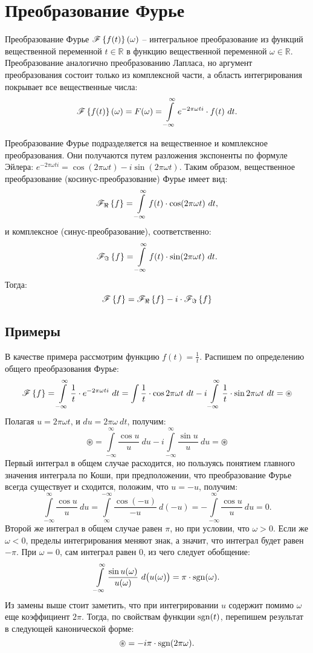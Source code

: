 \section{Преобразование Фурье}

	Преобразование Фурье $\mathscr{F} \left\lbrace {f(t)} \right\rbrace \left( \omega \right)$ -- интегральное преобразование из функций вещественной переменной $t \in \mathbb{R}$ в функцию вещественной переменной $\omega \in \mathbb{R}$. Преобразование аналогично преобразованию Лапласа, но аргумент преобразования состоит только из комплексной части, а область интегрирования покрывает все вещественные числа:
	\[ \mathscr{F} \left\lbrace {f(t)} \right\rbrace \left( \omega \right) = F(\omega) = \int\limits_{-\infty}^{\infty} e^{-2 \pi \omega t i} \cdot f(t) ~ dt. \]

	Преобразование Фурье подразделяется на вещественное и комплексное преобразования. Они получаются путем разложения экспоненты по формуле Эйлера: $e^{- 2 \pi \omega t i} = \cos(2 \pi \omega t) - i \sin(2 \pi \omega t)$. Таким образом, вещественное преобразование (косинус-преобразование) Фурье имеет вид:
	\[ \mathscr{F}_{\Re} \left\lbrace {f} \right\rbrace = \int\limits_{-\infty}^{\infty} f(t) \cdot \cos(2 \pi \omega t) ~ dt, \]
	и комплексное (синус-преобразование), соответственно:
	\[ \mathscr{F}_{\Im} \left\lbrace {f} \right\rbrace = \int\limits_{-\infty}^{\infty} f(t) \cdot \sin(2 \pi \omega t) ~ dt. \]
	Тогда:
	\[ \mathscr{F} \left\lbrace {f} \right\rbrace = \mathscr{F}_{\Re} \left\lbrace {f} \right\rbrace - i \cdot \mathscr{F}_{\Im} \left\lbrace {f} \right\rbrace \]

	\subsection{Примеры}

		В качестве примера рассмотрим функцию $f(t) = \frac{1}{t}$. Распишем по определению общего преобразования Фурье:
		\[ 
			\mathscr{F} \left\lbrace {f} \right\rbrace 
				= \int\limits_{-\infty}^{\infty} \frac{1}{t} \cdot e^{-2 \pi \omega t i} ~ dt 
				= \int \frac{1}{t} \cdot \cos{2 \pi \omega t} ~ dt 
				- i \int\limits_{-\infty}^{\infty} \frac{1}{t} \cdot \sin{2 \pi \omega t} ~ dt 
				= \circledast 
		\]
		Полагая $u = 2 \pi \omega t$, и $du = 2 \pi \omega ~ dt$, получим:
		\[ 
			\circledast 
				= \int\limits_{-\infty}^{\infty} \frac{\cos{u}}{u} ~ du 
				- i \int\limits_{-\infty}^{\infty} \frac{\sin{u}}{u} ~ du 
				= \circledast 
		\]
		Первый интеграл в общем случае расходится, но пользуясь понятием главного значения интеграла по Коши, при предположении, что преобразование Фурье всегда существует и сходится, положим, что $u = -u$, получим:
		\[ 
			\int\limits_{-\infty}^{\infty} \frac{\cos{u}}{u} ~ du 
				= \int\limits_{\infty}^{-\infty} \frac{\cos{(-u)}}{-u} ~ d(-u) 
				= -\int\limits_{-\infty}^{\infty} \frac{\cos{u}}{u} ~ du 
				= 0. 
		\]
		Второй же интеграл в общем случае равен $\pi$, но при условии, что $\omega > 0$. Если же $\omega < 0$, пределы интегрирования меняют знак, а значит, что интеграл будет равен $-\pi$. При $\omega = 0$, сам интеграл равен $0$, из чего следует обобщение:
		\[ 
			\int\limits_{-\infty}^{\infty} \frac{\sin{u(\omega)}}{u(\omega)} ~ d \bigl( u(\omega) \bigr) 
				= \pi \cdot \operatorname{sgn}(\omega). 
		\]
		Из замены выше стоит заметить, что при интегрировании $u$ содержит помимо $\omega$ еще коэффициент $2\pi$. Тогда, по свойствам функции $\operatorname{sgn}(t)$, перепишем результат в следующей канонической форме:
		\[ \circledast = -i \pi \cdot \operatorname{sgn}(2 \pi \omega). \]

